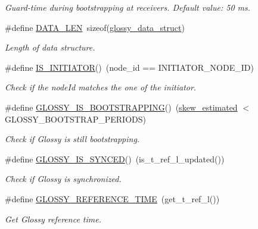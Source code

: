 \begin{DoxyCompactItemize}
\begin{DoxyCompactList}\small\item\em Guard-\/time during bootstrapping at receivers. Default value: 50 ms. \end{DoxyCompactList}\item 
\hypertarget{group__glossy-test-defines_gaf02e45f15080b8ec9dd7b286157617ff}{
\#define \hyperlink{group__glossy-test-defines_gaf02e45f15080b8ec9dd7b286157617ff}{DATA\_\-LEN}~sizeof(\hyperlink{structglossy__data__struct}{glossy\_\-data\_\-struct})}
\label{group__glossy-test-defines_gaf02e45f15080b8ec9dd7b286157617ff}

\begin{DoxyCompactList}\small\item\em Length of data structure. \end{DoxyCompactList}\item 
\hypertarget{group__glossy-test-defines_ga3d1e7d432a1b08c6c103a999b1dc76df}{
\#define \hyperlink{group__glossy-test-defines_ga3d1e7d432a1b08c6c103a999b1dc76df}{IS\_\-INITIATOR}()~(node\_\-id == INITIATOR\_\-NODE\_\-ID)}
\label{group__glossy-test-defines_ga3d1e7d432a1b08c6c103a999b1dc76df}

\begin{DoxyCompactList}\small\item\em Check if the nodeId matches the one of the initiator. \end{DoxyCompactList}\item 
\#define \hyperlink{group__glossy-test-defines_ga56eff93cc86164ca823e6853c8dbf8a1}{GLOSSY\_\-IS\_\-BOOTSTRAPPING}()~(\hyperlink{group__glossy-test-variables_ga8f7aae7ff4364a1481312cef44f65f73}{skew\_\-estimated} $<$ GLOSSY\_\-BOOTSTRAP\_\-PERIODS)
\begin{DoxyCompactList}\small\item\em Check if Glossy is still bootstrapping. \end{DoxyCompactList}\item 
\#define \hyperlink{group__glossy-test-defines_ga7d8d6a2abc29e1ea1ade49600faa5cfc}{GLOSSY\_\-IS\_\-SYNCED}()~(is\_\-t\_\-ref\_\-l\_\-updated())
\begin{DoxyCompactList}\small\item\em Check if Glossy is synchronized. \end{DoxyCompactList}\item 
\#define \hyperlink{group__glossy-test-defines_ga3eab42e5e2d60ea806b4c22447a9fb85}{GLOSSY\_\-REFERENCE\_\-TIME}~(get\_\-t\_\-ref\_\-l())
\begin{DoxyCompactList}\small\item\em Get Glossy reference time. \end{DoxyCompactList}\end{DoxyCompactItemize}


